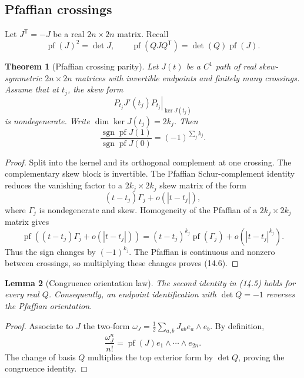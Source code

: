 \documentclass[11pt]{article}
\newtheorem{theorem}{Theorem}[section]
\newtheorem{lemma}[theorem]{Lemma}
\theoremstyle{remark}
\begin{document}
\subsection{Pfaffian crossings}

Let \(J^{\mathsf T}=-J\) be a real \(2n\times2n\) matrix.  Recall
\[
 \operatorname{pf}(J)^2=\det J,\qquad
 \operatorname{pf}(QJQ^{\mathsf T})
 =\det(Q)\operatorname{pf}(J).                                \tag{14.5}
\]

\begin{theorem}[Pfaffian crossing parity]
\label{thm:v19v11-pf-sign}
Let \(J(t)\) be a \(C^1\) path of real skew-symmetric \(2n\times2n\)
matrices with invertible endpoints and finitely many crossings.  Assume
that at \(t_j\), the skew form
\[
 \left.P_{t_j}J'(t_j)P_{t_j}\right|_{\ker J(t_j)}
\]
is nondegenerate.  Write \(\dim\ker J(t_j)=2k_j\).  Then
\[
 \frac{\operatorname{sgn}\operatorname{pf}J(1)}
      {\operatorname{sgn}\operatorname{pf}J(0)}
 =(-1)^{\sum_j k_j}.                                          \tag{14.6}
\]
\end{theorem}

\begin{proof}
Split into the kernel and its orthogonal complement at one crossing.
The complementary skew block is invertible.  The Pfaffian Schur-complement
identity reduces the vanishing factor to a \(2k_j\times2k_j\) skew matrix
of the form
\[
 (t-t_j)\Gamma_j+o(|t-t_j|),
\]
where \(\Gamma_j\) is nondegenerate and skew.  Homogeneity of the Pfaffian
of a \(2k_j\times2k_j\) matrix gives
\[
 \operatorname{pf}\!\left((t-t_j)\Gamma_j+o(|t-t_j|)\right)
 =(t-t_j)^{k_j}\operatorname{pf}(\Gamma_j)
   +o(|t-t_j|^{k_j}).                                         \tag{14.7}
\]
Thus the sign changes by \((-1)^{k_j}\).  The Pfaffian is continuous and
nonzero between crossings, so multiplying these changes proves (14.6).
\end{proof}

\begin{lemma}[Congruence orientation law]
\label{lem:v19v11-congruence}
The second identity in (14.5) holds for every real \(Q\).
Consequently, an endpoint identification with \(\det Q=-1\) reverses the
Pfaffian orientation.
\end{lemma}

\begin{proof}
Associate to \(J\) the two-form
\(\omega_J=\frac12\sum_{a,b}J_{ab}e_a\wedge e_b\).  By definition,
\[
 \frac{\omega_J^n}{n!}
 =\operatorname{pf}(J)e_1\wedge\cdots\wedge e_{2n}.
\]
The change of basis \(Q\) multiplies the top exterior form by
\(\det Q\), proving the congruence identity.
\end{proof}
\end{document}
